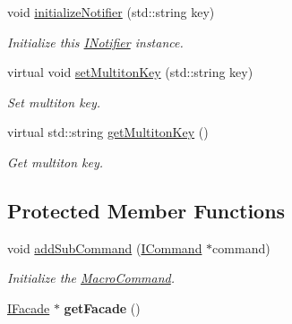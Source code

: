 \begin{DoxyCompactItemize}
\item 
void \hyperlink{class_pure_m_v_c_1_1_notifier_a6910365c70415ba7973401215f57e4af}{initializeNotifier} (std::string key)
\begin{DoxyCompactList}\small\item\em Initialize this \hyperlink{class_pure_m_v_c_1_1_i_notifier}{INotifier} instance. \item\end{DoxyCompactList}\item 
virtual void \hyperlink{class_pure_m_v_c_1_1_multiton_key_heir_abc70ef7c066bc8d7bf0196ec727599bb}{setMultitonKey} (std::string key)
\begin{DoxyCompactList}\small\item\em Set multiton key. \item\end{DoxyCompactList}\item 
virtual std::string \hyperlink{class_pure_m_v_c_1_1_multiton_key_heir_aa5622459d33380deb08dc3cab8b991c7}{getMultitonKey} ()
\begin{DoxyCompactList}\small\item\em Get multiton key. \item\end{DoxyCompactList}\end{DoxyCompactItemize}
\subsection*{Protected Member Functions}
\begin{DoxyCompactItemize}
\item 
void \hyperlink{class_pure_m_v_c_1_1_macro_command_a0e9c878d286520ebbf2964e4ba8a76b8}{addSubCommand} (\hyperlink{class_pure_m_v_c_1_1_i_command}{ICommand} $\ast$command)
\begin{DoxyCompactList}\small\item\em Initialize the {\ttfamily \hyperlink{class_pure_m_v_c_1_1_macro_command}{MacroCommand}}. \item\end{DoxyCompactList}\item 
\hypertarget{class_pure_m_v_c_1_1_notifier_a3eeda7190c0c0a2af8d34074df332bbe}{
\hyperlink{class_pure_m_v_c_1_1_i_facade}{IFacade} $\ast$ {\bfseries getFacade} ()}
\label{class_pure_m_v_c_1_1_notifier_a3eeda7190c0c0a2af8d34074df332bbe}

\end{DoxyCompactItemize}
